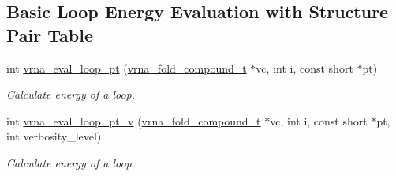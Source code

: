 \subsection*{Basic Loop Energy Evaluation with Structure Pair Table}
\begin{DoxyCompactItemize}
\item 
int \hyperlink{group__eval_ga730ba4df55c02fd530a0cddd49faf760}{vrna\+\_\+eval\+\_\+loop\+\_\+pt} (\hyperlink{group__fold__compound_ga1b0cef17fd40466cef5968eaeeff6166}{vrna\+\_\+fold\+\_\+compound\+\_\+t} $\ast$vc, int i, const short $\ast$pt)
\begin{DoxyCompactList}\small\item\em Calculate energy of a loop. \end{DoxyCompactList}\item 
int \hyperlink{group__eval_ga30faecaff1009fe62c58312c8d56dabb}{vrna\+\_\+eval\+\_\+loop\+\_\+pt\+\_\+v} (\hyperlink{group__fold__compound_ga1b0cef17fd40466cef5968eaeeff6166}{vrna\+\_\+fold\+\_\+compound\+\_\+t} $\ast$vc, int i, const short $\ast$pt, int verbosity\+\_\+level)
\begin{DoxyCompactList}\small\item\em Calculate energy of a loop. \end{DoxyCompactList}\end{DoxyCompactItemize}
